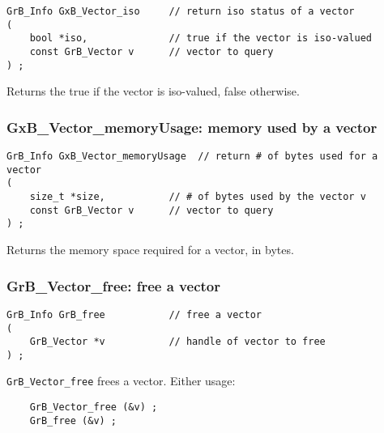 \documentclass[12pt]{article}
\begin{document}
\begin{mdframed}[userdefinedwidth=6in]
{\footnotesize
\begin{verbatim}
GrB_Info GxB_Vector_iso     // return iso status of a vector
(
    bool *iso,              // true if the vector is iso-valued
    const GrB_Vector v      // vector to query
) ;
\end{verbatim} } \end{mdframed}

Returns the true if the vector is iso-valued, false otherwise.

\subsubsection{{\sf GxB\_Vector\_memoryUsage:} memory used by a vector}
\label{vector_memusage}

\begin{mdframed}[userdefinedwidth=6in]
{\footnotesize
\begin{verbatim}
GrB_Info GxB_Vector_memoryUsage  // return # of bytes used for a vector
(
    size_t *size,           // # of bytes used by the vector v
    const GrB_Vector v      // vector to query
) ;
\end{verbatim} } \end{mdframed}

Returns the memory space required for a vector, in bytes.

\subsubsection{{\sf GrB\_Vector\_free:}          free a vector}
\label{vector_free}

\begin{mdframed}[userdefinedwidth=6in]
{\footnotesize
\begin{verbatim}
GrB_Info GrB_free           // free a vector
(
    GrB_Vector *v           // handle of vector to free
) ;
\end{verbatim}
} \end{mdframed}

\verb'GrB_Vector_free' frees a vector.  Either usage:

    {\small
    \begin{verbatim}
    GrB_Vector_free (&v) ;
    GrB_free (&v) ; \end{verbatim}}
\end{document}
